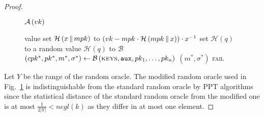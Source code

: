 \begin{proof}
\begin{figure}[H]
\begin{algobox}{$\mathcal{A}\left(vk\right)$}
\begin{algorithmic}[1]
                  value
                \EndIf
                \State set $\mathcal{H}\left(x \,\|\, mpk\right)$ to $\left(vk
                - mpk \cdot \mathcal{H}\left(mpk \,\|\, x\right)\right) \cdot
                x^{-1}$
                \label{proof:comb:share:ro:end}
              \Else
                \State set $\mathcal{H}\left(q\right)$ to a random value
              \EndIf
              \State \Return $\mathcal{H}\left(q\right)$ to $\mathcal{B}$
            \EndIndent
            \State $\left(cpk^*, pk^*, m^*, \sigma^*\right) \gets
            \mathcal{B}\left(\textsc{keys}, \mathtt{aux}, pk_1, \dots,
            pk_n\right)$
             
            \label{proof:comb:share:distinguisher:won}
              \State \Return $\left(m^*, \sigma^*\right)$
            \Else
              \State \Return \textsc{fail}
            \EndIf
          \end{algorithmic}
        \end{algobox}
        \caption{}
        \label{proof:comb:share:distinguisher}
      \end{figure}

      Let $Y$ be the range of the random oracle. The modified random oracle used
      in Fig.~\ref{proof:comb:share:distinguisher} is indistinguishable from the
      standard random oracle by PPT algorithms since the statistical distance of
      the standard random oracle from the modified one is at most
      $\frac{1}{2|Y|} < \mathit{negl}\left(k\right)$ as they differ in at most
      one element.


\end{proof}
